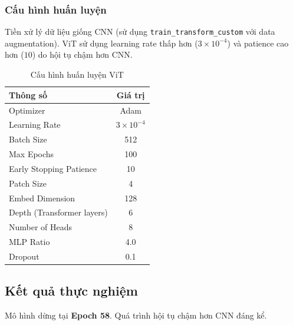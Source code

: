 \documentclass[a4paper]{article}
\newcommand{\code}[1]{\texttt{\textcolor{blue!80!black}{#1}}}
\theoremstyle{definition}
\begin{document}
\subsubsection{Cấu hình huấn luyện}
Tiền xử lý dữ liệu giống CNN (sử dụng \code{train\_transform\_custom} với data augmentation). ViT sử dụng learning rate thấp hơn ($3 \times 10^{-4}$) và patience cao hơn ($10$) do hội tụ chậm hơn CNN.

\begin{table}[H]
	\centering
	\caption{Cấu hình huấn luyện ViT}
	\begin{tabular}{|l|c|}
		\hline
		\textbf{Thông số}          & \textbf{Giá trị} \\ \hline
		Optimizer                  & Adam \\ \hline
		Learning Rate              & $3 \times 10^{-4}$ \\ \hline
		Batch Size                 & 512 \\ \hline
		Max Epochs                 & 100 \\ \hline
		Early Stopping Patience    & 10 \\ \hline
		Patch Size                 & 4 \\ \hline
		Embed Dimension            & 128 \\ \hline
		Depth (Transformer layers) & 6 \\ \hline
		Number of Heads            & 8 \\ \hline
		MLP Ratio                  & 4.0 \\ \hline
		Dropout                    & 0.1 \\ \hline
	\end{tabular}
	\label{tab:vit-config}
\end{table}

\subsection{Kết quả thực nghiệm}

Mô hình dừng tại \textbf{Epoch 58}. Quá trình hội tụ chậm hơn CNN đáng kể.
\end{document}
